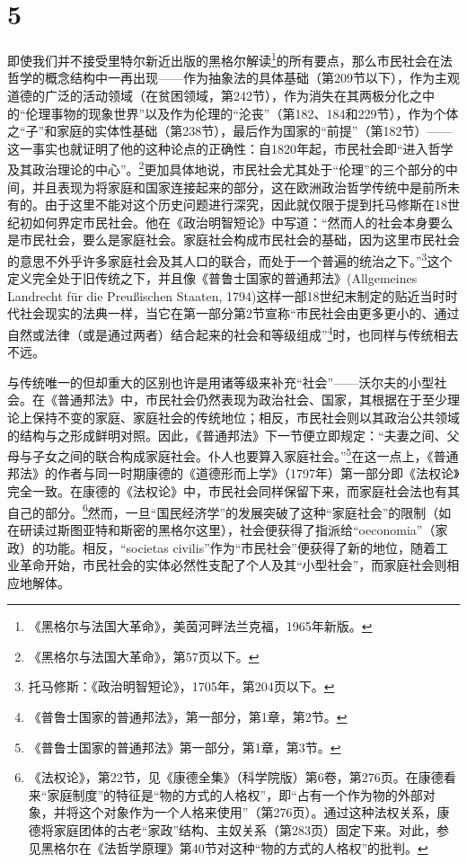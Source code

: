 \section*{5}

即使我们并不接受里特尔新近出版的黑格尔解读\footnote{《黑格尔与法国大革命》，美茵河畔法兰克福，1965年新版。}的所有要点，那么市民社会在法哲学的概念结构中一再出现——作为抽象法的具体基础（第209节以下），作为主观道德的广泛的活动领域（在贫困领域，第242节），作为消失在其两极分化之中的“伦理事物的现象世界”以及作为伦理的“沦丧”（第182、184和229节），作为个体之“子”和家庭的实体性基础（第238节），最后作为国家的“前提”（第182节）——这一事实也就证明了他的这种论点的正确性：自1820年起，市民社会即“进入哲学及其政治理论的中心”。\footnote{《黑格尔与法国大革命》，第57页以下。}更加具体地说，市民社会尤其处于“伦理”的三个部分的中间，并且表现为将家庭和国家连接起来的部分，这在欧洲政治哲学传统中是前所未有的。由于这里不能对这个历史问题进行深究，因此就仅限于提到托马修斯在18世纪初如何界定市民社会。他在《政治明智短论》中写道：“然而人的社会本身要么是市民社会，要么是家庭社会。家庭社会构成市民社会的基础，因为这里市民社会的意思不外乎许多家庭社会及其人口的联合，而处于一个普遍的统治之下。”\footnote{托马修斯：《政治明智短论》，1705年，第204页以下。}这个定义完全处于旧传统之下，并且像《普鲁士国家的普通邦法》(Allgemeines Landrecht für die Preußischen Staaten, 1794)这样一部18世纪末制定的贴近当时时代社会现实的法典一样，当它在第一部分第2节宣称“市民社会由更多更小的、通过自然或法律（或是通过两者）结合起来的社会和等级组成”\footnote{《普鲁士国家的普通邦法》，第一部分，第1章，第2节。}时，也同样与传统相去不远。

与传统唯一的但却重大的区别也许是用诸等级来补充“社会”——沃尔夫的小型社会。在《普通邦法》中，市民社会仍然表现为政治社会、国家，其根据在于至少理论上保持不变的家庭、家庭社会的传统地位；相反，市民社会则以其政治公共领域的结构与之形成鲜明对照。因此，《普通邦法》下一节便立即规定：“夫妻之间、父母与子女之间的联合构成家庭社会。仆人也要算入家庭社会。”\footnote{《普鲁士国家的普通邦法》第一部分，第1章，第3节。}在这一点上，《普通邦法》的作者与同一时期康德的《道德形而上学》（1797年）第一部分即《法权论》完全一致。在康德的《法权论》中，市民社会同样保留下来，而家庭社会法也有其自己的部分。\footnote{《法权论》，第22节，见《康德全集》（科学院版）第6卷，第276页。在康德看来“家庭制度”的特征是“物的方式的人格权”，即“占有一个作为物的外部对象，并将这个对象作为一个人格来使用”（第276页）。通过这种法权关系，康德将家庭团体的古老“家政”结构、主奴关系（第283页）固定下来。对此，参见黑格尔在《法哲学原理》第40节对这种“物的方式的人格权”的批判。}然而，一旦“国民经济学”的发展突破了这种“家庭社会”的限制（如在研读过斯图亚特和斯密的黑格尔这里），社会便获得了指派给“oeconomia”（家政）的功能。相反，“societas civilis”作为“市民社会”便获得了新的地位，随着工业革命开始，市民社会的实体必然性支配了个人及其“小型社会”，而家庭社会则相应地解体。

